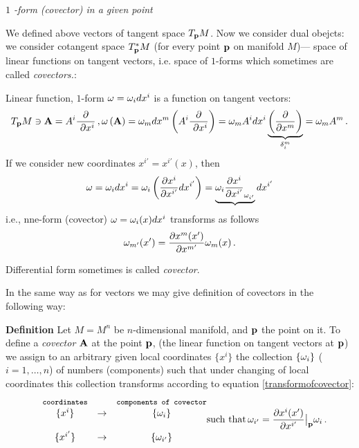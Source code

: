 \documentclass[12pt]{article}
\theoremstyle{theorem}
\numberwithin{equation}{section}
\begin{document}

{\it $1$ -form (covector) in a given point}

We defined above  vectors of tangent space $T_{\bf p} M$.
Now we consider dual obejcts: we consider cotangent space $T^*_{\bf p} M$
(for every point ${\bf p}$ on manifold $M$)---
    space of linear functions on tangent vectors, i.e. space 
of $1$-forms which sometimes are called
              {\it covectors.}:



 Linear function, $1$-form  $\omega=\omega_idx^i$ is a function on tangent vectors:
               $$
 T_{\bf p} M\ni{\bf A}=A^i{\partial \over \ \partial x^i}\,, \omega\left({\bf A}\right)
=\omega_mdx^m\left(A^i{\partial \over \ \partial x^i}\right)=\omega_mA^i dx^i
\underbrace{\left({\partial\over \partial x^m}\right)}_{\delta_i^m}=\omega_mA^m\,.
               $$ 
If we consider new coordinates $x^{i'}=x^{i'}(x)$, then
                  $$
\omega=\omega_idx^i=\omega_i\left({\partial x^i\over \partial x^{i'}}dx^{i'}\right)=
           \underbrace{\omega_i{\partial x^i\over \partial x^{i'}}_{\omega_{i'}}} dx^{i'}
                  $$
                   i.e., nne-form (covector) $\omega=\omega_i(x)dx^i$ 
transforms as follows
         \begin{equation}\label{transformofcovector}
            \omega_{m'}(x')={\partial x^{m}(x')\over \partial x^{m'}}\omega_m(x)\,.
         \end{equation}

Differential form sometimes is called {\it covector}.


In the same way as for vectors we may give definition
of covectors in the following way:

{\bf Definition}   Let $M=M^n$ be $n$-dimensional
manifold, and ${\bf p}$ the point on it.
To define a  {\it covector ${\bf A}$} at the point ${\bf p}$, 
(the linear function
on tangent vectors at ${\bf p}$)
we assign to an
arbitrary   
given local coordinates $\{x^i\}$
the collection $\{\omega_i\}$ ($i=1,\dots,n$)
of numbers (components) such that under 
changing of local coordinates
this collection transforms  according to equation
\eqref{transformofcovector}: 
         \begin{equation}\label{definitionofcovector}
  \begin{matrix}
&\hbox{{\tt {\footnotesize coordinates}}}
 &            
&\hbox{{\tt {\footnotesize components of covector}}}\cr
&\{x^i\}   &\rightarrow
     &   \{\omega_i\}\cr
 &&&\cr
&\{x^{i'}\}   &\rightarrow
     &   \{\omega_{i'}\}\cr
      \end{matrix}\hbox{such that}\, 
      \omega_{i'}=
{\partial x^{i}(x')\over \partial x^{i'}}\big\vert_{\bf p} \omega_i \,.  
        \end{equation}
\end{document}
